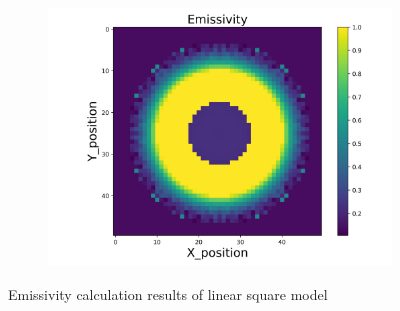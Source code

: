 \begin{figure}[p]
\begin{minipage}{\textwidth}
\begin{subfigure}{0.325\textwidth}
            \centering
            \includegraphics[width=\textwidth]{figures/raw_data/33/lin_square/emi_cal.jpg}
        \end{subfigure}
    \end{minipage}
    \caption{Emissivity calculation results of linear square model}  
\end{figure}


\newpage
